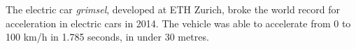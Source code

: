 The electric car \emph{grimsel}, developed at ETH Zurich, broke the world record for acceleration in electric cars in 2014.
The vehicle was able to accelerate from 0 to 100 km/h in 1.785 seconds, in under 30 metres.